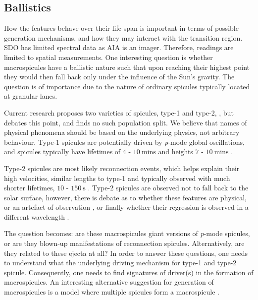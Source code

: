\subsection{Ballistics}
How the features behave over their life-span is important in terms of possible generation mechanisms, and how they may interact with the transition region. SDO has limited spectral data as AIA is an imager. Therefore, readings are limited to spatial measurements. One interesting question is whether macrospicules have a ballistic nature such that upon reaching their highest point they would then fall back only under the influence of the Sun's gravity. The question is of importance due to the nature of ordinary spicules typically located at granular lanes.

Current research proposes two varieties of spicules, type-1 and type-2, \cite{Pereira2012}, but \cite{Zhang2012} debates this point, and finds no such population split. We believe that names of physical phenomena should be based on the underlying physics, not arbitrary behaviour. Type-1 spicules are potentially driven by \emph{p}-mode global oscillations, and spicules typically have lifetimes of $4$ - $10\ \textrm{mins}$ and heights $7$ - $10\ \textrm{mins}$ \cite{DePontieu2004}.

Type-2 spicules are most likely reconnection events, which helps explain their high velocities, similar lengths to type-1 and typically observed with much shorter lifetimes, $10$ - $150\ \textrm{s}$ \cite{Isobe2008}. Type-2 spicules are observed not to fall back to the solar surface, however, there is debate as to whether these features are physical, or an artefact of observation \cite{Tsiropoula2012}, \cite{Sekse2013} or finally whether their regression is observed in a different wavelength \cite{Pereira2014}.

The question becomes: are these macrospicules giant versions of \emph{p}-mode spicules, or are they blown-up manifestations of reconnection spicules. Alternatively, are they related to these ejecta at all? In order to answer these questions, one needs to understand what the underlying driving mechanism for type-1 and type-2 spicule. Consequently, one needs to find signatures of driver(s) in the formation of macrospicules. An interesting alternative suggestion for generation of macrospicules is a model where multiple spicules form a macrospicule \cite{Xia2005}.

